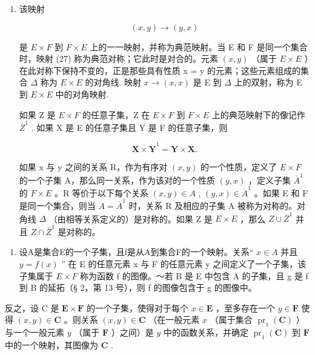 \begin{enumerate}
\def\labelenumi{\arabic{enumi}.}
\setcounter{enumi}{3}
\item
  该映射

\[
(x, y) \rightarrow (y, x)\tag{27}
\]

是 \(E \times F\) 到 \(F \times E\) 上的一一映射，并称为典范映射。当 E 和 F 是同一个集合时，映射 (27) 称为典范对称；它此时是对合的。元素 \((x, y)\) （属于 \(E \times E\) ）在此对称下保持不变的，正是那些具有性质 x = y 的元素；这些元素组成的集合 \(\Delta\) 称为 \(E \times E\) 的对角线. 映射 \(x \to (x, x)\) 是 E 到 \(\Delta\) 上的双射，称为 E 到 \(E \times E\) 中的对角映射.

如果 Z 是 \(E \times F\) 的任意子集，Z 在 \(E \times F\) 到 \(F \times E\) 上的典范映射下的像记作 \(\overline{Z}^{1}\) . 如果 X 是 E 的任意子集且 Y 是 F 的任意子集，则

\[
\overline{\mathbf {X} \times \mathbf {Y}}^{1} = \mathbf {Y} \times \mathbf {X}.
\]

如果 x 与 y 之间的关系 R，作为有序对 \((x, y)\) 的一个性质，定义了 \(E \times F\) 的一个子集 A，那么同一关系，作为该对的一个性质 \((y, x)\) ，定义子集 \(\overline{A}^{1}\) 的 \(F \times E\) 。R 等价于以下每个关系 \((x, y) \in A\) , \((y, x) \in \overline{A}^{1}\) 。如果 E 和 F 是同一个集合，则当 \(A = \overline{A}^{1}\) 时，关系 R 及相应的子集 A 被称为对称的。对角线 \(\Delta\) （由相等关系定义的）是对称的。如果 Z 是 \(E \times E\) ，那么 \(Z \cup \overline{Z}^{1}\) 并且 \(Z \cap \overline{Z}^{1}\) 是对称的。

\end{enumerate}

\begin{enumerate}
\def\labelenumi{\arabic{enumi}.}
\setcounter{enumi}{4}
\tightlist
\item
  设A是集合E的一个子集，且f是从A到集合F的一个映射。关系“ \(x \in A\) 并且 \(y = f(x)\) '' 在 E 的任意元素 x 与 F 的任意元素 y 之间定义了一个子集，该子集属于 \(E \times F\) 称为函数 f 的图像。～若 B 是 E 中包含 A 的子集，且 g 是 f 到 B 的延拓（§ 2，第 13 号），则 f 的图像包含于 g 的图像中。
\end{enumerate}

反之，设 C 是 \(\mathbf{E} \times \mathbf{F}\) 的一个子集，使得对于每个 \(x \in \mathbf{E}\) ，至多存在一个 \(y \in \mathbf{F}\) 使得 \((x, y) \in \mathbf{C}\) 。则关系 \((x, y) \in \mathbf{C}\) （在一般元素 \(x\) （属于集合 \(\operatorname{pr}_1(\mathbf{C})\) ）与一个一般元素 \(y\) （属于 \(\mathbf{F}\) ）之间）是 \(y\) 中的函数关系，并确定 \(\operatorname{pr}_1(\mathbf{C})\) 到 \(\mathbf{F}\) 中的一个映射，其图像为 \(\mathbf{C}\) .

